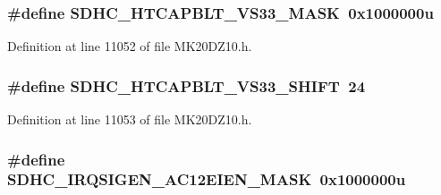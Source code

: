 \subsubsection[{\texorpdfstring{S\+D\+H\+C\+\_\+\+H\+T\+C\+A\+P\+B\+L\+T\+\_\+\+V\+S33\+\_\+\+M\+A\+SK}{SDHC_HTCAPBLT_VS33_MASK}}]{\setlength{\rightskip}{0pt plus 5cm}\#define S\+D\+H\+C\+\_\+\+H\+T\+C\+A\+P\+B\+L\+T\+\_\+\+V\+S33\+\_\+\+M\+A\+SK~0x1000000u}\hypertarget{group___s_d_h_c___register___masks_gaefb26b10e16d07a763c3a6aa87d64c77}{}\label{group___s_d_h_c___register___masks_gaefb26b10e16d07a763c3a6aa87d64c77}


Definition at line 11052 of file M\+K20\+D\+Z10.\+h.

\subsubsection[{\texorpdfstring{S\+D\+H\+C\+\_\+\+H\+T\+C\+A\+P\+B\+L\+T\+\_\+\+V\+S33\+\_\+\+S\+H\+I\+FT}{SDHC_HTCAPBLT_VS33_SHIFT}}]{\setlength{\rightskip}{0pt plus 5cm}\#define S\+D\+H\+C\+\_\+\+H\+T\+C\+A\+P\+B\+L\+T\+\_\+\+V\+S33\+\_\+\+S\+H\+I\+FT~24}\hypertarget{group___s_d_h_c___register___masks_ga134420d6cffd9c730caecd7cc64f1d41}{}\label{group___s_d_h_c___register___masks_ga134420d6cffd9c730caecd7cc64f1d41}


Definition at line 11053 of file M\+K20\+D\+Z10.\+h.

\subsubsection[{\texorpdfstring{S\+D\+H\+C\+\_\+\+I\+R\+Q\+S\+I\+G\+E\+N\+\_\+\+A\+C12\+E\+I\+E\+N\+\_\+\+M\+A\+SK}{SDHC_IRQSIGEN_AC12EIEN_MASK}}]{\setlength{\rightskip}{0pt plus 5cm}\#define S\+D\+H\+C\+\_\+\+I\+R\+Q\+S\+I\+G\+E\+N\+\_\+\+A\+C12\+E\+I\+E\+N\+\_\+\+M\+A\+SK~0x1000000u}\hypertarget{group___s_d_h_c___register___masks_gacd242a1e4fdf5a31371c37720b6c5067}{}\label{group___s_d_h_c___register___masks_gacd242a1e4fdf5a31371c37720b6c5067}


